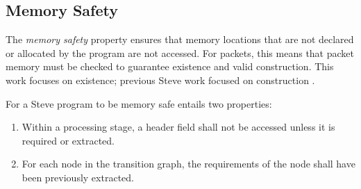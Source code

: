 
%
%

\subsection{Memory Safety} \label{guide:requirements}

The \emph{memory safety} property ensures that memory locations that are not declared or allocated by the program are not accessed. For packets, this means that packet memory must be checked to guarantee existence and valid construction. This work focuses on existence; previous Steve work focused on construction \cite{wripe}.

For a Steve program to be memory safe entails two properties:

\begin{enumerate}
\item Within a processing stage, a header field shall not be accessed unless it is required or extracted.
\item For each node in the transition graph, the requirements of the node shall have been previously extracted.
\end{enumerate}

